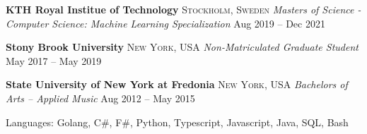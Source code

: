 \documentclass[10pt,letterpaper]{article}
\begin{document}

\headedsection
{\textbf{KTH Royal Institue of Technology}}
{\textsc{Stockholm, Sweden}} {
	\headedsubsection
	{\textit{Masters of Science - Computer Science: Machine Learning Specialization}}
	{Aug 2019 -- Dec 2021}
	{\bodytext{}}
}
\vspace{-5mm}


\headedsection
{\textbf{Stony Brook University}}
{\textsc{New York, USA}} {
	\headedsubsection
	{\textit{Non-Matriculated Graduate Student}}
	{May 2017 -- May 2019}
	{\bodytext{}}
}
\vspace{-5mm}


\headedsection
{\textbf{State University of New York at Fredonia}}
{\textsc{New York, USA}} {
	\headedsubsection
	{\textit{Bachelors of Arts -- Applied Music}}
	{Aug 2012 -- May 2015}
	{\bodytext{}}
}
\vspace{-5mm}


\spacedhrule{0.6em}{-0.7em}








\inlineheadsection
{Languages:}
{Golang, C\#, F\#, Python, Typescript, Javascript, Java, SQL, Bash}
\vspace{.9em}
\end{document}
